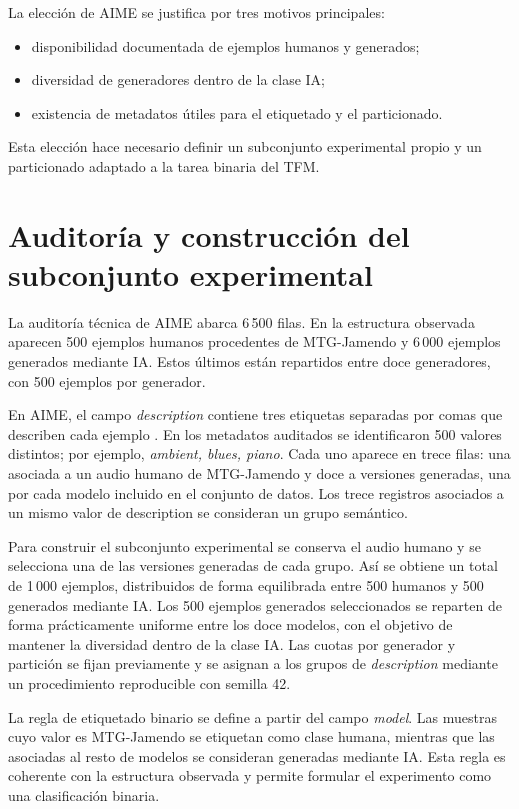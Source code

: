 La elección de AIME se justifica por tres motivos principales:
\begin{itemize}
    \item disponibilidad documentada de ejemplos humanos y generados;
    \item diversidad de generadores dentro de la clase IA;
    \item existencia de metadatos útiles para el etiquetado y el particionado.
\end{itemize}

Esta elección hace necesario definir un subconjunto experimental propio y un particionado adaptado a la tarea binaria del TFM.

\section{Auditoría y construcción del subconjunto experimental}

La auditoría técnica de AIME abarca 6\,500 filas. En la estructura observada aparecen 500 ejemplos humanos procedentes de MTG-Jamendo y 6\,000 ejemplos generados mediante IA. Estos últimos están repartidos entre doce generadores, con 500 ejemplos por generador.

En AIME, el campo \textit{description} contiene tres etiquetas separadas por comas que describen cada ejemplo \cite{discoethAIME}. En los metadatos auditados se identificaron 500 valores distintos; por ejemplo, \textit{ambient, blues, piano}. Cada uno aparece en trece filas: una asociada a un audio humano de MTG-Jamendo y doce a versiones generadas, una por cada modelo incluido en el conjunto de datos. Los trece registros asociados a un mismo valor de description se consideran un grupo semántico.

Para construir el subconjunto experimental se conserva el audio humano y se selecciona una de las versiones generadas de cada grupo. Así se obtiene un total de 1\,000 ejemplos, distribuidos de forma equilibrada entre 500 humanos y 500 generados mediante IA. Los 500 ejemplos generados seleccionados se reparten de forma prácticamente uniforme entre los doce modelos, con el objetivo de mantener la diversidad dentro de la clase IA. Las cuotas por generador y partición se fijan previamente y se asignan a los grupos de \textit{description} mediante un procedimiento reproducible con semilla 42.

La regla de etiquetado binario se define a partir del campo \textit{model}. Las muestras cuyo valor es MTG-Jamendo se etiquetan como clase humana, mientras que las asociadas al resto de modelos se consideran generadas mediante IA. Esta regla es coherente con la estructura observada y permite formular el experimento como una clasificación binaria.

